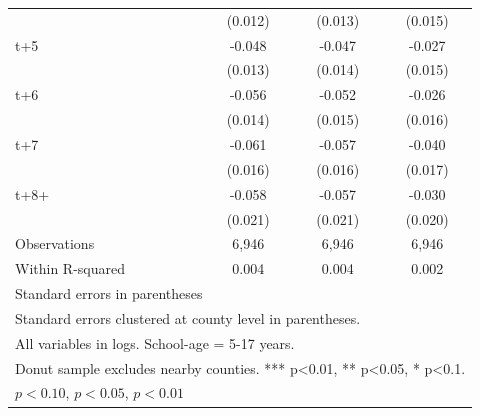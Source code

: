 \begin{table}[htbp]
\begin{tabular}{l*{3}{c}}
            &     (0.012)         &     (0.013)         &     (0.015)         \\
[1em]
t+5         &      -0.048\sym{***}&      -0.047\sym{***}&      -0.027\sym{*}  \\
            &     (0.013)         &     (0.014)         &     (0.015)         \\
[1em]
t+6         &      -0.056\sym{***}&      -0.052\sym{***}&      -0.026         \\
            &     (0.014)         &     (0.015)         &     (0.016)         \\
[1em]
t+7         &      -0.061\sym{***}&      -0.057\sym{***}&      -0.040\sym{**} \\
            &     (0.016)         &     (0.016)         &     (0.017)         \\
[1em]
t+8+        &      -0.058\sym{***}&      -0.057\sym{***}&      -0.030         \\
            &     (0.021)         &     (0.021)         &     (0.020)         \\
\hline
Observations&       6,946         &       6,946         &       6,946         \\
Within R-squared&       0.004         &       0.004         &       0.002         \\
\hline\hline
\multicolumn{4}{l}{\footnotesize Standard errors in parentheses}\\
\multicolumn{4}{l}{\footnotesize Standard errors clustered at county level in parentheses.}\\
\multicolumn{4}{l}{\footnotesize All variables in logs. School-age = 5-17 years.}\\
\multicolumn{4}{l}{\footnotesize Donut sample excludes nearby counties. *** p<0.01, ** p<0.05, * p<0.1.}\\
\multicolumn{4}{l}{\footnotesize \sym{*} \(p<0.10\), \sym{**} \(p<0.05\), \sym{***} \(p<0.01\)}\\
\end{tabular}
\end{table}
